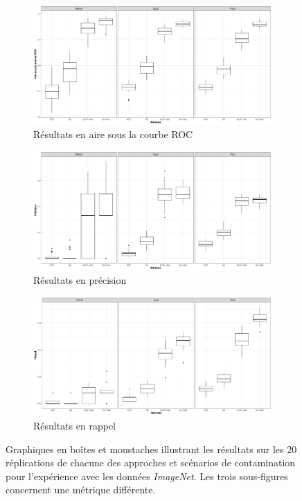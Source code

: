 \begin{figure}[h!]
	\centering
	\begin{subfigure}{12cm}
		\includegraphics[width=12cm]{images/images_boxplots/auc_cars.pdf}
		\caption{Résultats en aire sous la courbe ROC}
	\end{subfigure}
	\begin{subfigure}{12cm}
		\includegraphics[width=12cm]{images/images_boxplots/precision_cars.pdf}
		\caption{Résultats en précision}
	\end{subfigure}
	\begin{subfigure}{12cm}
		\includegraphics[width=12cm]{images/images_boxplots/recall_cars.pdf}
		\caption{Résultats en rappel}
	\end{subfigure}
	\DIFdelbeginFL %
\DIFdelendFL \DIFaddbeginFL \caption[Graphiques en boîtes et moustaches illustrant les résultats sur \textit{ImageNet}.]{\DIFaddendFL Graphiques en boîtes et moustaches illustrant les résultats sur les 20 réplications de chacune des approches et scénarios de contamination pour l'expérience avec les données \textit{ImageNet}. Les trois sous-figures concernent une métrique différente.}
	\label{fig:auc_cars}
\end{figure}

